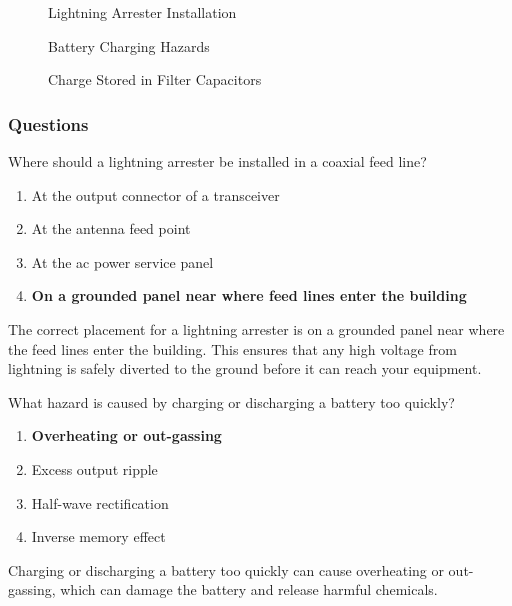 \begin{figure}[h]
    \centering
    \caption{Lightning Arrester Installation}
    \label{fig:lightning-arrester}
\end{figure}

\begin{figure}[h]
    \centering
    \caption{Battery Charging Hazards}
    \label{fig:battery-hazards}
\end{figure}

\begin{figure}[h]
    \centering
    \caption{Charge Stored in Filter Capacitors}
    \label{fig:capacitor-charge}
\end{figure}

\subsubsection{Questions}
\begin{tcolorbox}[colback=gray!10!white,colframe=black!75!black,title={T0A07}]
    Where should a lightning arrester be installed in a coaxial feed line?
    \begin{enumerate}[label=\Alph*),noitemsep]
        \item At the output connector of a transceiver
        \item At the antenna feed point
        \item At the ac power service panel
        \item \textbf{On a grounded panel near where feed lines enter the building}
    \end{enumerate}
\end{tcolorbox}
The correct placement for a lightning arrester is on a grounded panel near where the feed lines enter the building. This ensures that any high voltage from lightning is safely diverted to the ground before it can reach your equipment.

\begin{tcolorbox}[colback=gray!10!white,colframe=black!75!black,title={T0A10}]
    What hazard is caused by charging or discharging a battery too quickly?
    \begin{enumerate}[label=\Alph*),noitemsep]
        \item \textbf{Overheating or out-gassing}
        \item Excess output ripple
        \item Half-wave rectification
        \item Inverse memory effect
    \end{enumerate}
\end{tcolorbox}
Charging or discharging a battery too quickly can cause overheating or out-gassing, which can damage the battery and release harmful chemicals.

